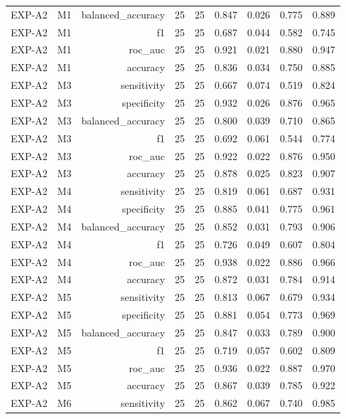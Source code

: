 \begin{table}[htbp]
\begin{tabular}{lrrrrrrrr}
    EXP-A2 & M1 & balanced\_accuracy & 25 & 25 & 0.847 & 0.026 & 0.775 & 0.889 \\
    EXP-A2 & M1 & f1 & 25 & 25 & 0.687 & 0.044 & 0.582 & 0.745 \\
    EXP-A2 & M1 & roc\_auc & 25 & 25 & 0.921 & 0.021 & 0.880 & 0.947 \\
    EXP-A2 & M1 & accuracy & 25 & 25 & 0.836 & 0.034 & 0.750 & 0.885 \\
    EXP-A2 & M3 & sensitivity & 25 & 25 & 0.667 & 0.074 & 0.519 & 0.824 \\
    EXP-A2 & M3 & specificity & 25 & 25 & 0.932 & 0.026 & 0.876 & 0.965 \\
    EXP-A2 & M3 & balanced\_accuracy & 25 & 25 & 0.800 & 0.039 & 0.710 & 0.865 \\
    EXP-A2 & M3 & f1 & 25 & 25 & 0.692 & 0.061 & 0.544 & 0.774 \\
    EXP-A2 & M3 & roc\_auc & 25 & 25 & 0.922 & 0.022 & 0.876 & 0.950 \\
    EXP-A2 & M3 & accuracy & 25 & 25 & 0.878 & 0.025 & 0.823 & 0.907 \\
    EXP-A2 & M4 & sensitivity & 25 & 25 & 0.819 & 0.061 & 0.687 & 0.931 \\
    EXP-A2 & M4 & specificity & 25 & 25 & 0.885 & 0.041 & 0.775 & 0.961 \\
    EXP-A2 & M4 & balanced\_accuracy & 25 & 25 & 0.852 & 0.031 & 0.793 & 0.906 \\
    EXP-A2 & M4 & f1 & 25 & 25 & 0.726 & 0.049 & 0.607 & 0.804 \\
    EXP-A2 & M4 & roc\_auc & 25 & 25 & 0.938 & 0.022 & 0.886 & 0.966 \\
    EXP-A2 & M4 & accuracy & 25 & 25 & 0.872 & 0.031 & 0.784 & 0.914 \\
    EXP-A2 & M5 & sensitivity & 25 & 25 & 0.813 & 0.067 & 0.679 & 0.934 \\
    EXP-A2 & M5 & specificity & 25 & 25 & 0.881 & 0.054 & 0.773 & 0.969 \\
    EXP-A2 & M5 & balanced\_accuracy & 25 & 25 & 0.847 & 0.033 & 0.789 & 0.900 \\
    EXP-A2 & M5 & f1 & 25 & 25 & 0.719 & 0.057 & 0.602 & 0.809 \\
    EXP-A2 & M5 & roc\_auc & 25 & 25 & 0.936 & 0.022 & 0.887 & 0.970 \\
    EXP-A2 & M5 & accuracy & 25 & 25 & 0.867 & 0.039 & 0.785 & 0.922 \\
    EXP-A2 & M6 & sensitivity & 25 & 25 & 0.862 & 0.067 & 0.740 & 0.985 \\

\end{tabular}
\end{table}
